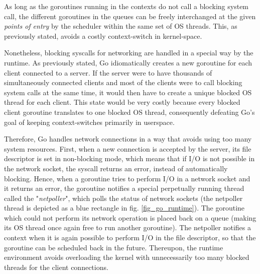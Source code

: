 As long as the goroutines running in the contexts do not call a blocking system call, the different goroutines in the queues can be freely interchanged at the given \textit{points of entry} by the scheduler within the same set of OS threads. This, as previously stated, avoids a costly context-switch in kernel-space. 

Nonetheless, blocking syscalls for networking are handled in a special way by the runtime. As previously stated, Go idiomatically creates a new goroutine for each client connected to a server. If the server were to have thousands of simultaneously connected clients and most of the clients were to call blocking system calls at the same time, it would then have to create a unique blocked OS thread for each client. This state would be very costly because every blocked client goroutine translates to one blocked OS thread, consequently defeating Go's goal of keeping context-switches primarily in userspace.

Therefore, Go handles network connections in a way that avoids using too many system resources. First, when a new connection is accepted by the server, its file descriptor is set in non-blocking mode, which means that if I/O is not possible in the network socket, the syscall returns an error, instead of automatically blocking. Hence, when a goroutine tries to perform I/O in a network socket and it returns an error, the goroutine notifies a special perpetually running thread called the "\textit{netpoller}", which polls the status of network sockets \cite{Morsing2013_2} (the netpoller thread is depicted as a blue rectangle in fig. \ref{fig_go_runtime}). The goroutine which could not perform its network operation is placed back on a queue (making its OS thread once again free to run another goroutine). The netpoller notifies a context when it is again possible to perform I/O in the file descriptor, so that the goroutine can be scheduled back in the future. Thereupon, the runtime environment avoids overloading the kernel with unnecessarily too many blocked threads for the client connections.